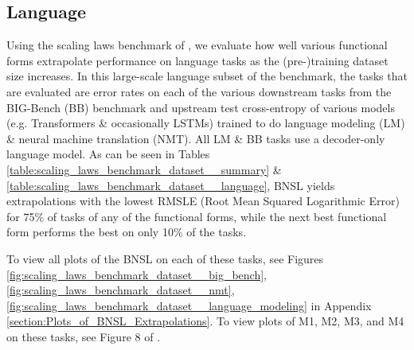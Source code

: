 \documentclass{article} %
\begin{document}
\subsection{Language}
\label{section:scaling_benchmark__language}
\vspace{-0.9mm}
Using the scaling laws benchmark of \cite{Alabdulmohsi2022revisiting}, we evaluate how well various functional forms extrapolate performance on language tasks as the (pre-)training dataset size increases. In this large-scale language subset of the benchmark, the tasks that are evaluated are error rates on each of the various downstream tasks from the BIG-Bench (BB) \citep{srivastava2022beyond} benchmark and upstream test cross-entropy of various models (e.g. Transformers \& occasionally LSTMs) trained to do language modeling (LM) \& neural machine translation (NMT). All LM \& BB tasks use a decoder-only language model. As can be seen in Tables  \ref{table:scaling_laws_benchmark_dataset__summary} \& \ref{table:scaling_laws_benchmark_dataset__language}, BNSL yields extrapolations with the lowest RMSLE (Root Mean Squared Logarithmic Error) for 75\% of tasks of any of the functional forms, while the next best functional form performs the best on only 10\% of the tasks.




\vspace{-2.0mm}

To view all plots of the BNSL on each of these tasks, see Figures
\ref{fig:scaling_laws_benchmark_dataset__big_bench},
\ref{fig:scaling_laws_benchmark_dataset__nmt},
\ref{fig:scaling_laws_benchmark_dataset__language_modeling} in Appendix \ref{section:Plots_of_BNSL_Extrapolations}. To view plots of M1, M2, M3, and M4 on these tasks, see Figure 8 of \cite{Alabdulmohsi2022revisiting}.
\end{document}
